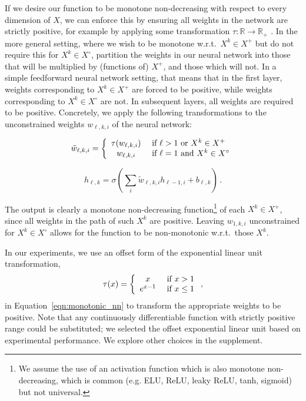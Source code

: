     If we desire our function to be monotone non-decreasing with respect to every dimension of $X$, we can enforce this by ensuring all weights in the network are strictly positive, for example by applying some transformation $\tau:\mathbb{R}\rightarrow \mathbb{R}_+$ \cite{sill1998monotonic}. In the more general setting, where we wish to be monotone w.r.t.~$X^k\in X^+$ but do not require this for $X^k\in X^\circ$, partition the weights in our neural network into those that will be multiplied by (functions of) $X^+$, and those which will not. In a simple feedforward neural network setting, that means that in the first layer, weights corresponding to $X^k\in X^+$ are forced to be positive, while weights corresponding to $X^k\in X^\circ$ are not. In subsequent layers, all weights are required to be positive. Concretely, we apply the following transformations to the unconstrained weights $w_{\ell, k, i}$ of the neural network:
    
    \begin{equation} 
        \tilde{w}_{\ell, k, i} = \left\{ \begin{array}{c l}
            \tau(w_{\ell, k, i}) & ~\mbox{if}~ \ell > 1 \mbox{ or } X^k \in X^+ \\ 
            w_{\ell, k, i} & ~\mbox{if}~ \ell = 1 \mbox{ and } X^k \in X^\circ \\ 
        \end{array} \right. \label{eqn:transformation} 
    \end{equation}
    
    \begin{equation}
        h_{\ell, k} = \sigma\left(\sum_i \tilde{w}_{\ell, k, i} h_{\ell-1, i} + b_{\ell, k}\right)\, .\label{eqn:monotonic_nn}
    \end{equation}
    
    The output is clearly a monotone non-decreasing function\footnote{We assume the use of an activation function which is also monotone non-decreasing, which is common (e.g. ELU, ReLU, leaky ReLU, tanh, sigmoid) but not universal.} of each $X^k\in X^+$, since all weights in the path of such $X^k$ are positive. Leaving $w_{1, k, i}$ unconstrained for $X^k\in X^\circ$ allows for the function to be non-monotonic w.r.t.\ those $X^k$.

    In our experiments, we use an offset form of the exponential linear unit~\cite{clevert2015elu} transformation, 
    \begin{equation}\tau(x) = \left\{\begin{array}{c l} 
        x       & ~\mbox{if}~ x > 1 \\ 
        e^{x-1} & ~\mbox{if}~ x \le 1 \\ 
    \end{array}\right.,\label{eqn:tau}\end{equation}
    in Equation~\ref{eqn:monotonic_nn} to transform the appropriate weights to be positive. Note that any continuously differentiable function with strictly positive range could be substituted; we selected the offset exponential linear unit based on experimental performance. We explore other choices in the supplement.  

